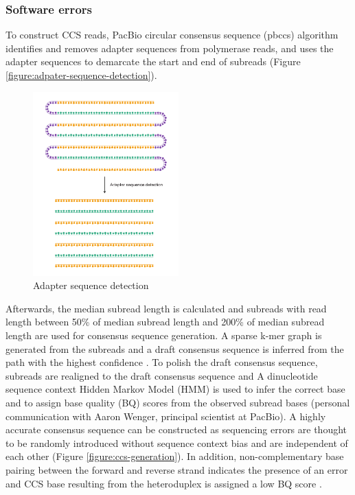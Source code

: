 \subsubsection{Software errors}

To construct CCS reads, PacBio circular consensus sequence (pbccs) algorithm identifies and removes adapter sequences from polymerase reads, and uses the adapter sequences to demarcate the start and end of subreads (Figure \ref{figure:adpater-sequence-detection}). 

\begin{figure}[htbp!]
\caption{Adapter sequence detection}
\label{figure:adapter-sequence-detection}
\begin{centering}
\includegraphics[width=0.5\textwidth]{Vector/adapter-sequence-detection.pdf}
\end{centering}
\end{figure}

Afterwards, the median subread length is calculated and subreads with read length between 50\% of median subread length and 200\% of median subread length are used for consensus sequence generation. A sparse k-mer graph is generated from the subreads and a draft consensus sequence is inferred from the path with the highest confidence \cite{Ye2016-qe}. To polish the draft consensus sequence, subreads are realigned to the draft consensus sequence and A dinucleotide sequence context Hidden Markov Model (HMM) is used to infer the correct base and to assign base quality (BQ) scores from the observed subread bases (personal communication with Aaron Wenger, principal scientist at PacBio). A highly accurate consensus sequence can be constructed as sequencing errors are thought to be randomly introduced without sequence context bias and are independent of each other (Figure \ref{figure:ccs-generation}). In addition, non-complementary base pairing between the forward and reverse strand indicates the presence of an error and CCS base resulting from the heteroduplex is assigned a low BQ score \cite{ccs2023}. 

